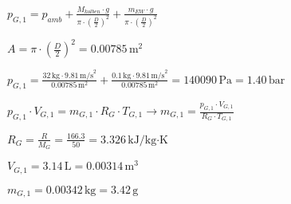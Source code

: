 \( p_{G,1} = p_{amb} + \frac{M_{kolben} \cdot g}{\pi \cdot \left(\frac{D}{2}\right)^2} + \frac{m_{EW} \cdot g}{\pi \cdot \left(\frac{D}{2}\right)^2} \)  

\( A = \pi \cdot \left(\frac{D}{2}\right)^2 = 0.00785 \, \text{m}^2 \)  

\( p_{G,1} = \frac{32 \, \text{kg} \cdot 9.81 \, \text{m/s}^2}{0.00785 \, \text{m}^2} + \frac{0.1 \, \text{kg} \cdot 9.81 \, \text{m/s}^2}{0.00785 \, \text{m}^2} = 140090 \, \text{Pa} = 1.40 \, \text{bar} \)  

\( p_{G,1} \cdot V_{G,1} = m_{G,1} \cdot R_{G} \cdot T_{G,1} \rightarrow m_{G,1} = \frac{p_{G,1} \cdot V_{G,1}}{R_{G} \cdot T_{G,1}} \)  

\( R_{G} = \frac{R}{M_{G}} = \frac{166.3}{50} = 3.326 \, \text{kJ/kg·K} \)  

\( V_{G,1} = 3.14 \, \text{L} = 0.00314 \, \text{m}^3 \)  

\( m_{G,1} = 0.00342 \, \text{kg} = 3.42 \, \text{g} \)